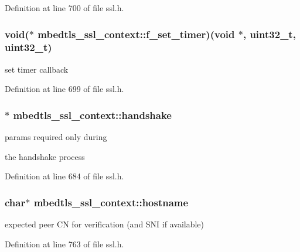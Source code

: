 Definition at line 700 of file ssl.\-h.

\hypertarget{structmbedtls__ssl__context_a206faf1d8f390868f68e7166f982dad6}{
\subsubsection[{f\-\_\-set\-\_\-timer}]{\setlength{\rightskip}{0pt plus 5cm}void($\ast$ mbedtls\-\_\-ssl\-\_\-context\-::f\-\_\-set\-\_\-timer)(void $\ast$, uint32\-\_\-t, uint32\-\_\-t)}}\label{structmbedtls__ssl__context_a206faf1d8f390868f68e7166f982dad6}
set timer callback 

Definition at line 699 of file ssl.\-h.

\hypertarget{structmbedtls__ssl__context_aca0569b7d5c02f79c47fdc964dcc7309}{
\subsubsection[{handshake}]{$\ast$ mbedtls\-\_\-ssl\-\_\-context\-::handshake}}\label{structmbedtls__ssl__context_aca0569b7d5c02f79c47fdc964dcc7309}
\begin{DoxyVerb}   params required only during
\end{DoxyVerb}
 the handshake process 

Definition at line 684 of file ssl.\-h.

\hypertarget{structmbedtls__ssl__context_a32d4187f88ff6a5153cfd85c6a752cb9}{
\subsubsection[{hostname}]{\setlength{\rightskip}{0pt plus 5cm}char$\ast$ mbedtls\-\_\-ssl\-\_\-context\-::hostname}}\label{structmbedtls__ssl__context_a32d4187f88ff6a5153cfd85c6a752cb9}
expected peer C\-N for verification (and S\-N\-I if available) 

Definition at line 763 of file ssl.\-h.

